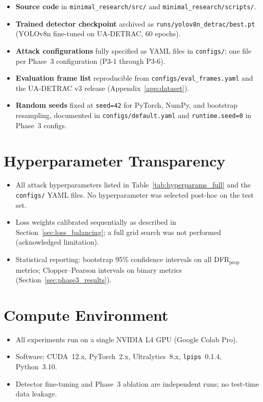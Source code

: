 \documentclass[12pt,a4paper]{report}
\begin{document}
\begin{itemize}[itemsep=4pt]
  \item[\checkmark] \textbf{Source code} in \texttt{minimal\_research/src/}
    and \texttt{minimal\_research/scripts/}.
  \item[\checkmark] \textbf{Trained detector checkpoint} archived as
    \texttt{runs/yolov8n\_detrac/best.pt} (YOLOv8n fine-tuned on
    UA-DETRAC, 60 epochs).
  \item[\checkmark] \textbf{Attack configurations} fully specified as YAML
    files in \texttt{configs/}; one file per Phase~3 configuration
    (P3-1 through P3-6).
  \item[\checkmark] \textbf{Evaluation frame list} reproducible from
    \texttt{configs/eval\_frames.yaml} and the UA-DETRAC v3 release
    (Appendix~\ref{app:dataset}).
  \item[\checkmark] \textbf{Random seeds} fixed at \texttt{seed=42} for
    PyTorch, NumPy, and bootstrap resampling, documented in
    \texttt{configs/default.yaml} and \texttt{runtime.seed=0} in
    Phase~3 configs.
\end{itemize}

\section{Hyperparameter Transparency}

\begin{itemize}[itemsep=4pt]
  \item[\checkmark] All attack hyperparameters listed in
    Table~\ref{tab:hyperparams_full} and the \texttt{configs/} YAML
    files.  No hyperparameter was selected post-hoc on the test set.
  \item[\checkmark] Loss weights calibrated sequentially as described in
    Section~\ref{sec:loss_balancing}; a full grid search was not
    performed (acknowledged limitation).
  \item[\checkmark] Statistical reporting: bootstrap 95\% confidence
    intervals on all DFR$_\text{prop}$ metrics; Clopper--Pearson
    intervals on binary metrics (Section~\ref{sec:phase3_results}).
\end{itemize}

\section{Compute Environment}

\begin{itemize}[itemsep=4pt]
  \item[\checkmark] All experiments run on a single NVIDIA L4 GPU
    (Google Colab Pro).
  \item[\checkmark] Software: CUDA~12.x, PyTorch~2.x, Ultralytics~8.x,
    \texttt{lpips}~0.1.4, Python~3.10.
  \item[\checkmark] Detector fine-tuning and Phase~3 ablation are
    independent runs; no test-time data leakage.
\end{itemize}
\end{document}
